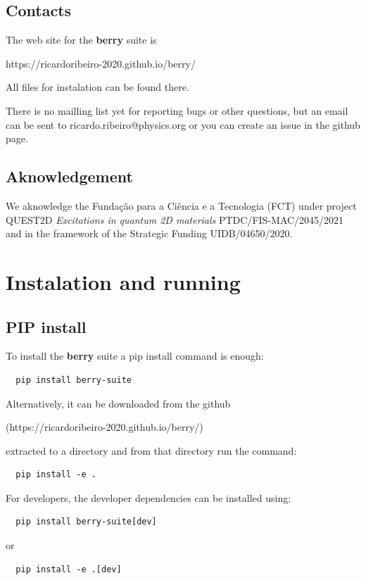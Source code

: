 \documentclass[a4paper,12pt]{report}
\begin{document}
\section{Contacts}

The web site for the \textbf{berry} suite is\medskip

https://ricardoribeiro-2020.github.io/berry/\medskip

All files for instalation can be found there.

There is no mailling list yet for reporting bugs or other questions, but an email can be sent to
ricardo.ribeiro@physics.org or you can create an issue in the github page.

\section{Aknowledgement}

We aknowledge the Fundação para a Ciência e a Tecnologia (FCT)
under project  QUEST2D \emph{Excitations in quantum 2D materials}
PTDC/FIS-MAC/2045/2021 and in the framework of the Strategic Funding UIDB/04650/2020.






\chapter{Instalation and running}

\section{PIP install}

To install the \textbf{berry} suite a pip install command is enough:
\begin{verbatim}
  pip install berry-suite
\end{verbatim}

Alternatively, it can be downloaded from the github

(https://ricardoribeiro-2020.github.io/berry/)

extracted to a directory and from that directory run the command:
\begin{verbatim}
  pip install -e .
\end{verbatim}

For developers, the developer dependencies can be installed using:
\begin{verbatim}
  pip install berry-suite[dev]
\end{verbatim}
or
\begin{verbatim}
  pip install -e .[dev]
\end{verbatim}
\end{document}
